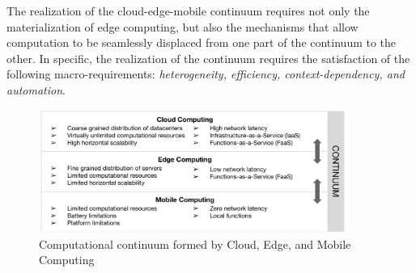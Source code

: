 The realization of the cloud-edge-mobile continuum requires not only the materialization of edge computing, but also the mechanisms that allow computation to be seamlessly displaced from one part of the continuum to the other. In specific, the realization of the continuum requires the satisfaction of the following macro-requirements: \textit{heterogeneity, efficiency, context-dependency, and automation}.

\begin{figure}[tbp]
	\includegraphics[width=0.9\textwidth]{figs/Continuum.pdf}
	\caption{Computational continuum formed by Cloud, Edge, and Mobile Computing}
	\label{fig:continuum}
\end{figure}

 



